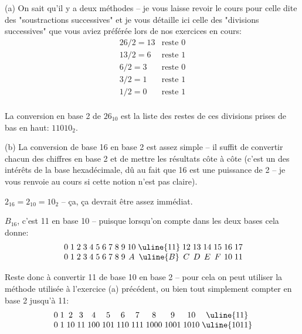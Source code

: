 \documentclass[11pt,a4paper]{exam}
\begin{document}
\begin{questions}
\begin{spacing}{1}
	           	\begin{solution}
					(a) On sait qu'il y a deux méthodes -- je vous laisse revoir le cours pour celle dite des "soustractions successives" et je vous détaille ici celle des "divisions successives" que vous aviez préférée lors de nos exercices en cours:
					\[
					\begin{array}{ll}
						26 / 2 = 13 & \text{reste } 0 \\
						13 / 2 = 6 & \text{reste } 1 \\
						6 / 2 = 3 & \text{reste } 0 \\
						3 / 2 = 1 & \text{reste } 1 \\
						1 / 2 = 0 & \text{reste } 1 \\
					\end{array}
					\]
					
					La conversion en base 2 de $26_{10}$ est la liste des restes de ces divisions prises de bas en haut: $11010_{2}$.
					
					(b) La conversion de base 16 en base 2 est assez simple -- il suffit de convertir chacun des chiffres en base 2 et de mettre les résultats côte à côte (c'est un des intérêts de la base hexadécimale, dû au fait que 16 est une puissance de 2 -- je vous renvoie au cours si cette notion n'est pas claire).
					
					$2_{16} = 2_{10} = 10_2$ -- ça, ça devrait être assez immédiat.
					
					$B_{16}$, c'est 11 en base 10 -- puisque lorsqu'on compte dans les deux bases cela donne:
					\[
					\begin{array}{r *{18}{@{\;}c}}
						0 & 1 & 2 & 3 & 4 & 5 & 6 & 7 & 8 & 9 & 10 & \uline{\textbf{}11} & 12 & 13 & 14 & 15 & 16 & 17 \\
						0 & 1 & 2 & 3 & 4 & 5 & 6 & 7 & 8 & 9 & A & \uline{\textbf{}B} & C & D & E & F & 10 & 11 \\
					\end{array}
					\]
					
					Reste donc à convertir 11 de base 10 en base 2 -- pour cela on peut utiliser la méthode utilisée à l'exercice (a) précédent, ou bien tout simplement compter en base 2 jusqu'à 11:
					\[
					\begin{array}{r *{12}{@{\;}c}}
						0 & 1 & 2 & 3 & 4 & 5 & 6 & 7 & 8 & 9 & 10 & \uline{\textbf{}11} \\
						0 & 1 & 10 & 11 & 100 & 101 & 110 & 111 & 1000 & 1001 & 1010 & \uline{\textbf{}1011} \\
					\end{array}
					\]
					

\end{solution}
\end{spacing}
\end{questions}
\end{document}
